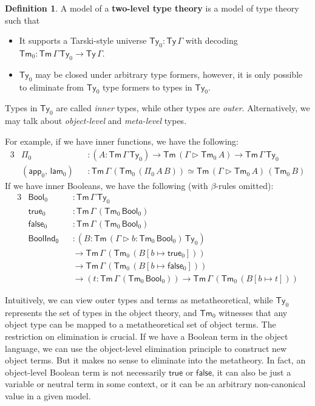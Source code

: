 \documentclass[12pt,a4paper,twoside,openany]{book}
\theoremstyle{remark}
\theoremstyle{definition}
\newtheorem{mydefinition}{Definition}
\theoremstyle{theorem}
\newcommand{\ms}[1]{\mathsf{#1}}
\newcommand{\Tm}{\mathsf{Tm}}
\newcommand{\Ty}{\mathsf{Ty}}
\newcommand{\ext}{\triangleright}
\newcommand{\app}{\ms{app}}
\newcommand{\Bool}{\ms{Bool}}
\newcommand{\lam}{\ms{lam}}
\newcommand{\true}{\ms{true}}
\newcommand{\false}{\ms{false}}
\begin{document}
\begin{mydefinition}
A model of a \textbf{two-level type theory} is a model of type theory such that
\begin{itemize}
  \item It supports a Tarski-style universe $\Ty_0 : \Ty\,\Gamma$ with decoding $\Tm_0 :
    \Tm\,\Gamma\,\Ty_0 \to \Ty\,\Gamma$.
  \item $\Ty_0$ may be closed under arbitrary type formers, however, it is only possible
    to eliminate from $\Ty_0$ type formers to types in $\Ty_0$.
\end{itemize}
Types in $\Ty_0$ are called \emph{inner} types, while other types are \emph{outer}. Alternatively,
we may talk about \emph{object-level} and \emph{meta-level} types.
\end{mydefinition}

For example, if we have inner functions, we have the following:
\begin{alignat*}{3}
  &\Pi_0 &&: (A : \Tm\,\Gamma\,\Ty_0) \to \Tm\,(\Gamma \ext \Tm_0\,A) \to \Tm\,\Gamma\,\Ty_0\\
  &(\app_0,\,\lam_0) &&: \Tm\,\Gamma\,(\Tm_0\,(\Pi_0\,A\,B)) \simeq \Tm\,(\Gamma \ext \Tm_0\,A)\,(\Tm_0\,B)
\end{alignat*}
If we have inner Booleans, we have the following (with $\beta$-rules omitted):
\begin{alignat*}{3}
  &\Bool_0 &&: \Tm\,\Gamma\,\Ty_0\\
  &\true_0 &&: \Tm\,\Gamma\,(\Tm_0\,\Bool_0)\\
  &\false_0 &&: \Tm\,\Gamma\,(\Tm_0\,\Bool_0)\\
  & \ms{BoolInd_0} &&: (B : \Tm\,(\Gamma\ext b : \Tm_0\,\Bool_0)\,\Ty_0)\\
  & && \to \Tm\,\Gamma\,(\Tm_0\,(B[b \mapsto \true_0]))\\
  & &&\to \Tm\,\Gamma\,(\Tm_0\,(B[b \mapsto \false_0]))\\
  & && \to (t : \Tm\,\Gamma\,(\Tm_0\,\Bool_0)) \to \Tm\,\Gamma\,(\Tm_0\,(B[b \mapsto t]))
\end{alignat*}

Intuitively, we can view outer types and terms as metatheoretical, while $\Ty_0$
represents the set of types in the object theory, and $\Tm_0$ witnesses that any
object type can be mapped to a metatheoretical set of object terms. The
restriction on elimination is crucial. If we have a Boolean term in the object
language, we can use the object-level elimination principle to construct new
object terms. But it makes no sense to eliminate into the metatheory. In fact,
an object-level Boolean term is not necessarily $\true$ or $\false$, it can also
be just a variable or neutral term in some context, or it can be an arbitrary
non-canonical value in a given model.
\end{document}
